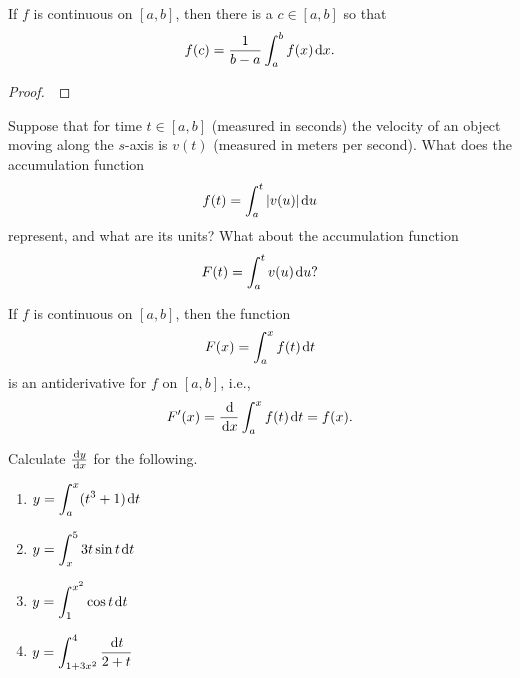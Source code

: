 \setcounter{chapter}{5}
\setcounter{section}{4}
\setcounter{theorem}{0}
\setcounter{equation}{0}


\begin{theorem}
If $f$ is continuous on $[a,b]$, then there is a $c\in [a,b]$ so that
\begin{equation*}
f(c) = \frac{1}{b-a}\int_a^bf(x)\mkern 2mu \mathrm{d} x.
\end{equation*}
\end{theorem}
\begin{proof}\,

\vspace{5.5in}
\end{proof}

\newpage

\begin{example}
Suppose that for time $t \in [a,b]$ (measured in seconds) the velocity of an object moving along the $s$-axis is $v(t)$ (measured in meters per second).
What does the accumulation function 
\begin{equation*}
f(t)=\int_a^t|v(u)|\mkern 2mu \mathrm{d} u
\end{equation*}
represent, and what are its units?
What about the accumulation function
\begin{equation*}
F(t)=\int_a^tv(u)\mkern 2mu \mathrm{d} u?
\end{equation*}
\end{example}

\newpage

\begin{theorem}
If $f$ is continuous on $[a,b]$, then the function
\begin{equation*}
F(x)=\int_a^xf(t)\mkern 2mu \mathrm{d} t
\end{equation*}
is an antiderivative for $f$ on $[a,b]$, i.e., 
\begin{equation*}
F'(x)=\frac{\mkern 2mu \mathrm{d}}{\mkern 2mu \mathrm{d} x}\int_a^xf(t)\mkern 2mu \mathrm{d} t = f(x).
\end{equation*}
\end{theorem}

\begin{example}
Calculate $\frac{\mkern 2mu \mathrm{d} y}{\mkern 2mu \mathrm{d} x}$ for the following.
\begin{enumerate}[label=(\alph*)]
\item $y = \displaystyle\int_a^x(t^3+1)\mkern 2mu \mathrm{d} t$
\vfill
\item $y = \displaystyle\int_x^53t\sin t\mkern 2mu \mathrm{d} t$
\vfill
\newpage
\item $y = \displaystyle\int_1^{x^2}\cos t\mkern 2mu \mathrm{d} t$
\vfill
\item $y = \displaystyle\int_{1+3x^2}^4\frac{\mkern 2mu \mathrm{d} t}{2+t}$
\vfill
\end{enumerate}
\end{example}

